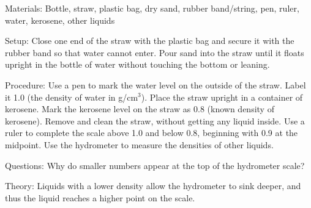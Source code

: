 \begin{multicols}{2}
\begin{description*}
\item[Materials:]{Bottle, straw, plastic bag, dry sand, rubber band/string, pen, ruler, water, kerosene, other liquids}
\item[Setup:]{Close one end of the straw with the plastic bag and secure it with the rubber band so that water cannot enter. Pour sand into the straw until it floats upright in the bottle of water without touching the bottom or leaning.}
\item[Procedure:]{Use a pen to mark the water level on the outside of the straw. Label it 1.0 (the density of water in g/cm$^3$). Place the straw upright in a container of kerosene. Mark the kerosene level on the straw as 0.8 (known density of kerosene). Remove and clean the straw, without getting any liquid inside. Use a ruler to complete the scale above 1.0 and below 0.8, beginning with 0.9 at the midpoint. Use the hydrometer to measure the densities of other liquids.}
\item[Questions:]{Why do smaller numbers appear at the top of the hydrometer scale?}
\item[Theory:]{Liquids with a lower density allow the hydrometer to sink deeper, and thus the liquid reaches a higher point on the scale.}
\end{description*}


\end{multicols}

\pagebreak